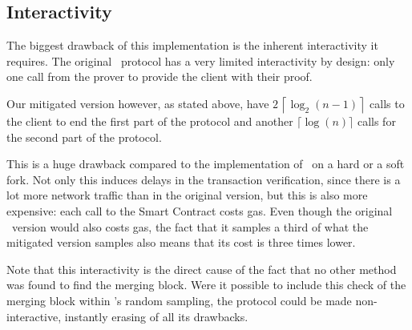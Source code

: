     \subsection{Interactivity}
        The biggest drawback of this implementation is the inherent interactivity it requires. The original \FC\ protocol has a very limited interactivity by design: only one call from the prover to provide the client with their proof.
        
        Our mitigated version however, as stated above, have \(2\,\left\lceil\log_2(n-1)\right\rceil\) calls to the client to end the first part of the protocol and another \(\lceil\log(n)\rceil\) calls for the second part of the protocol.
        
        This is a huge drawback compared to the implementation of \FC\ on a hard or a soft fork. Not only this induces delays in the transaction verification, since there is a lot more network traffic than in the original version, but this is also more expensive: each call to the Smart Contract costs gas. Even though the original \FC\ version would also costs gas, the fact that it samples a third of what the mitigated version samples also means that its cost is three times lower.
        
        Note that this interactivity is the direct cause of the fact that no other method was found to find the merging block. Were it possible to include this check of the merging block within \FC's random sampling, the protocol could be made non-interactive, instantly erasing of all its drawbacks.
